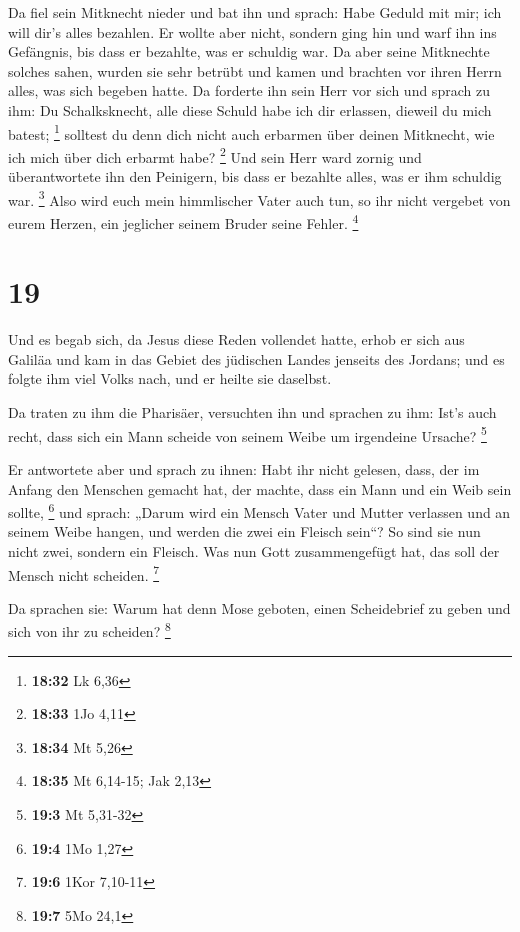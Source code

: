  Da fiel sein Mitknecht nieder und bat ihn und sprach: Habe
Geduld mit mir; ich will dir's alles bezahlen.  Er wollte
aber nicht, sondern ging hin und warf ihn ins Gefängnis, bis dass er
bezahlte, was er schuldig war.  Da aber seine Mitknechte
solches sahen, wurden sie sehr betrübt und kamen und brachten vor ihren
Herrn alles, was sich begeben hatte.  Da forderte ihn sein
Herr vor sich und sprach zu ihm: Du Schalksknecht, alle diese Schuld
habe ich dir erlassen, dieweil du mich batest; \footnote{\textbf{18:32}
  Lk 6,36}  solltest du denn dich nicht auch erbarmen über
deinen Mitknecht, wie ich mich über dich erbarmt habe? \footnote{\textbf{18:33}
  1Jo 4,11}  Und sein Herr ward zornig und überantwortete
ihn den Peinigern, bis dass er bezahlte alles, was er ihm schuldig war.
\footnote{\textbf{18:34} Mt 5,26}  Also wird euch mein
himmlischer Vater auch tun, so ihr nicht vergebet von eurem Herzen, ein
jeglicher seinem Bruder seine Fehler. \footnote{\textbf{18:35} Mt
  6,14-15; Jak 2,13}

\hypertarget{section-11}{%
\section{19}\label{section-11}}

 Und es begab sich, da Jesus diese Reden vollendet hatte,
erhob er sich aus Galiläa und kam in das Gebiet des jüdischen Landes
jenseits des Jordans;  und es folgte ihm viel Volks nach,
und er heilte sie daselbst.

 Da traten zu ihm die Pharisäer, versuchten ihn und sprachen
zu ihm: Ist's auch recht, dass sich ein Mann scheide von seinem Weibe um
irgendeine Ursache? \footnote{\textbf{19:3} Mt 5,31-32}

 Er antwortete aber und sprach zu ihnen: Habt ihr nicht
gelesen, dass, der im Anfang den Menschen gemacht hat, der machte, dass
ein Mann und ein Weib sein sollte, \footnote{\textbf{19:4} 1Mo 1,27}
 und sprach: „Darum wird ein Mensch Vater und Mutter
verlassen und an seinem Weibe hangen, und werden die zwei ein Fleisch
sein``?  So sind sie nun nicht zwei, sondern ein Fleisch.
Was nun Gott zusammengefügt hat, das soll der Mensch nicht scheiden.
\footnote{\textbf{19:6} 1Kor 7,10-11}

 Da sprachen sie: Warum hat denn Mose geboten, einen
Scheidebrief zu geben und sich von ihr zu scheiden? \footnote{\textbf{19:7}
  5Mo 24,1}

